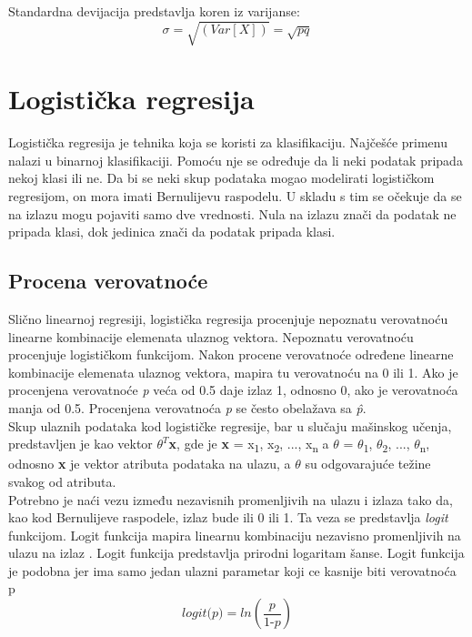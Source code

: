 \documentclass[a4paper,12pt]{report}
\begin{document}
Standardna devijacija predstavlja koren iz varijanse:
\begin{equation}
\sigma = \sqrt{(Var[X])} = \sqrt{pq}
\end{equation}

\section{Logistička regresija}

Logistička regresija je tehnika koja se koristi za klasifikaciju. Najčešće primenu nalazi u binarnoj klasifikaciji. Pomoću nje se određuje da li neki podatak pripada nekoj klasi ili ne. Da bi se neki skup podataka mogao modelirati logističkom regresijom, on mora imati Bernulijevu raspodelu. U skladu s tim se očekuje da se na izlazu mogu pojaviti samo dve vrednosti. Nula na izlazu znači da podatak ne pripada klasi, dok jedinica znači da podatak pripada klasi. 

\subsection{Procena verovatnoće}

Slično linearnoj regresiji, logistička regresija procenjuje nepoznatu verovatnoću linearne kombinacije elemenata ulaznog vektora. Nepoznatu verovatnoću procenjuje logističkom funkcijom. Nakon procene verovatnoće određene linearne kombinacije elemenata ulaznog vektora, mapira tu verovatnoću na 0 ili 1. Ako je procenjena verovatnoće \textit{p} veća od 0.5 daje izlaz 1, odnosno 0, ako je verovatnoća manja od 0.5. Procenjena verovatnoća \textit{p} se često obelažava sa \textit{\^{p}}. \\

Skup ulaznih podataka kod logističke regresije, bar u slučaju mašinskog učenja, predstavljen je kao vektor \textbf{$\theta^T$x}, gde je \textbf{x} = {x\textsubscript{1}, x\textsubscript{2}, ..., x\textsubscript{n}} a $\theta$ = {$\theta$\textsubscript{1}, $\theta$\textsubscript{2}, ..., $\theta$\textsubscript{n}}, odnosno \textbf{x} je vektor atributa podataka na ulazu, a $\theta$ su odgovarajuće težine svakog od atributa. \\

Potrebno je naći vezu između nezavisnih promenljivih na ulazu i izlaza tako da, kao kod Bernulijeve raspodele, izlaz bude ili 0 ili 1. Ta veza se predstavlja \textit{logit} funkcijom. Logit funkcija mapira linearnu kombinaciju nezavisno promenljivih na ulazu na izlaz . Logit funkcija predstavlja prirodni logaritam šanse. Logit funkcija je podobna jer ima samo jedan ulazni parametar koji ce kasnije biti verovatnoća p \\
\begin{equation}
\textit{logit(p)} = ln \left( \frac{\textit{p}}{\textit{1-p}} \right)
\end{equation}
\end{document}
